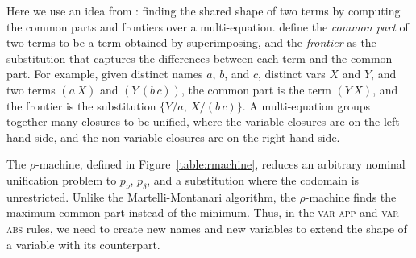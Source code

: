 \documentclass[a4paper,UKenglish]{lipics-v2016}
\newcommand{\bd}[2] {
 #1/ #2
}
\newcommand*{\transname}[1]{\textsc{#1}}
\begin{document}

Here we use an idea from \citet{martelli_efficient_1982}:
finding the shared shape of two terms by computing
the common parts and frontiers over a multi-equation.
\citeauthor{martelli_efficient_1982} define
the \emph{common part} of two terms to be a term obtained by superimposing,
and the \emph{frontier} as the substitution that
captures the differences between each term and the common part.
For example, given distinct names $a$, $b$, and $c$,
distinct vars $X$ and $Y$,
and two terms $(a\,X)$ and $(Y\,(b\,c))$,
the common part is the term $(Y\,X)$,
and the frontier is the substitution $\{\bd{Y}{a},\,\bd{X}{(b\,c)}\}$.
A multi-equation groups together many closures to be unified,
where the variable closures are on the left-hand side,
and the non-variable closures are on the right-hand side.

The $\rho$-machine, defined in
Figure~\ref{table:rmachine}, 
reduces an arbitrary nominal unification problem to
$p_\nu$, $p_\delta$, and a substitution where the codomain is unrestricted.
Unlike the Martelli-Montanari algorithm,
the $\rho$-machine finds the maximum common part instead of the minimum.
Thus, in the
\transname{var-app} and \transname{var-abs} rules, we need to create
new names and new variables
to extend the shape of a variable with its counterpart.
\end{document}
